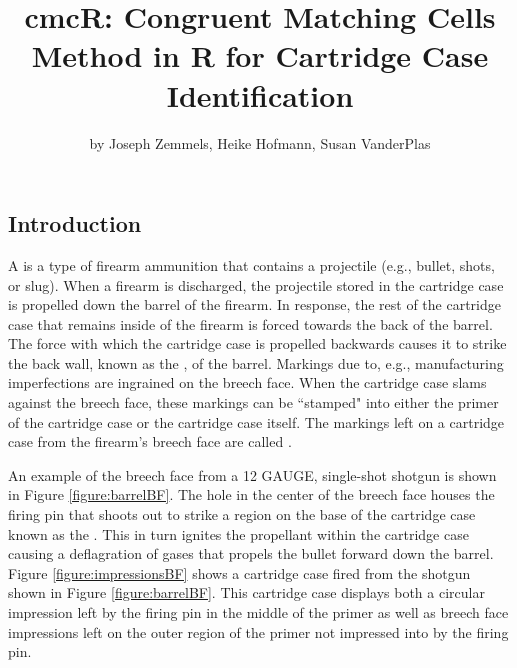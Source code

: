 \title{cmcR: Congruent Matching Cells Method in R for Cartridge Case
Identification}
\author{by Joseph Zemmels, Heike Hofmann, Susan VanderPlas}

\maketitle


\hypertarget{intro}{%
\subsection{Introduction}\label{intro}}

A  is a type of firearm ammunition that contains a
projectile (e.g., bullet, shots, or slug). When a firearm is discharged,
the projectile stored in the cartridge case is propelled down the barrel
of the firearm. In response, the rest of the cartridge case that remains
inside of the firearm is forced towards the back of the barrel. The
force with which the cartridge case is propelled backwards causes it to
strike the back wall, known as the , of the barrel.
Markings due to, e.g., manufacturing imperfections are ingrained on the
breech face. When the cartridge case slams against the breech face,
these markings can be ``stamped" into either the primer of the cartridge
case or the cartridge case itself. The markings left on a cartridge case
from the firearm's breech face are called .

An example of the breech face from a 12 GAUGE, single-shot shotgun is
shown in Figure \ref{figure:barrelBF}. The hole in the center of the
breech face houses the firing pin that shoots out to strike a region on
the base of the cartridge case known as the . This in turn
ignites the propellant within the cartridge case causing a deflagration
of gases that propels the bullet forward down the barrel. Figure
\ref{figure:impressionsBF} shows a cartridge case fired from the shotgun
shown in Figure \ref{figure:barrelBF}. This cartridge case displays both
a circular impression left by the firing pin in the middle of the primer
as well as breech face impressions left on the outer region of the
primer not impressed into by the firing pin.

